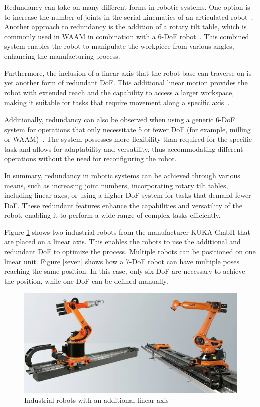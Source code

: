 Redundancy can take on many different forms in robotic systems. One option is to increase the number of joints in the serial kinematics of an articulated robot~\cite{Milenkovic.2021}. Another approach to redundancy is the addition of a rotary tilt table, which is commonly used in WAAM in combination with a 6-DoF robot~\cite{Yuan.2020}. This combined system enables the robot to manipulate the workpiece from various angles, enhancing the manufacturing process.

Furthermore, the inclusion of a linear axis that the robot base can traverse on is yet another form of redundant DoF. This additional linear motion provides the robot with extended reach and the capability to access a larger workspace, making it suitable for tasks that require movement along a specific axis~\cite{Boscariol.2019}.

Additionally, redundancy can also be observed when using a generic 6-DoF system for operations that only necessitate 5 or fewer DoF (for example, milling or WAAM)~\cite{Hanafusa.1981,Liu.2022}. The system possesses more flexibility than required for the specific task and allows for adaptability and versatility, thus accommodating different operations without the need for reconfiguring the robot.

In summary, redundancy in robotic systems can be achieved through various means, such as increasing joint numbers, incorporating rotary tilt tables, including linear axes, or using a higher DoF system for tasks that demand fewer DoF. These redundant features enhance the capabilities and versatility of the robot, enabling it to perform a wide range of complex tasks efficiently.

Figure \ref{linear} shows two industrial robots from the manufacturer KUKA GmbH that are placed on a linear axis. This enables the robots to use the additional and redundant DoF to optimize the process. Multiple robots can be positioned on one linear unit. 
Figure \ref{seven} shows how a 7-DoF robot can have multiple poses reaching the same position. In this case, only six DoF are necessary to achieve the position, while one DoF can be defined manually.

\begin{figure}[H]
	\centerline{\includegraphics[scale=.4]{figures/linear.png}}
	\caption{Industrial robots with an additional linear axis~\cite{linear}}
	\label{linear}
\end{figure}


